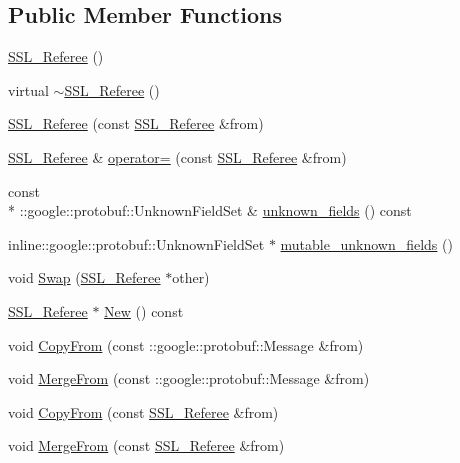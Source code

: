 \subsection*{Public Member Functions}
\begin{DoxyCompactItemize}
\item 
\hyperlink{class_s_s_l___referee_a093eac7249efad9cc2841868b0a1a130}{S\-S\-L\-\_\-\-Referee} ()
\item 
virtual \hyperlink{class_s_s_l___referee_aacd1e7f1df293ed0c0d8441cdb005b6f}{$\sim$\-S\-S\-L\-\_\-\-Referee} ()
\item 
\hyperlink{class_s_s_l___referee_ab26b371158dcb6d5ce7034c042829efc}{S\-S\-L\-\_\-\-Referee} (const \hyperlink{class_s_s_l___referee}{S\-S\-L\-\_\-\-Referee} \&from)
\item 
\hyperlink{class_s_s_l___referee}{S\-S\-L\-\_\-\-Referee} \& \hyperlink{class_s_s_l___referee_a41f6b8fc601ceb95f38dcfffb3e1102b}{operator=} (const \hyperlink{class_s_s_l___referee}{S\-S\-L\-\_\-\-Referee} \&from)
\item 
const \\*
\-::google\-::protobuf\-::\-Unknown\-Field\-Set \& \hyperlink{class_s_s_l___referee_a7b5d65bdf5c73d7d38f3581f33bd60df}{unknown\-\_\-fields} () const 
\item 
inline\-::google\-::protobuf\-::\-Unknown\-Field\-Set $\ast$ \hyperlink{class_s_s_l___referee_a4ee4e8c3f65057449661137b87cb4b8a}{mutable\-\_\-unknown\-\_\-fields} ()
\item 
void \hyperlink{class_s_s_l___referee_a8e6cdf85d949df10f65a3af1384ebcb9}{Swap} (\hyperlink{class_s_s_l___referee}{S\-S\-L\-\_\-\-Referee} $\ast$other)
\item 
\hyperlink{class_s_s_l___referee}{S\-S\-L\-\_\-\-Referee} $\ast$ \hyperlink{class_s_s_l___referee_abfaca893f74ef96eb4c4ad9c2d14edcc}{New} () const 
\item 
void \hyperlink{class_s_s_l___referee_ab67f7eb473dae8eac4097fcb9c9984cf}{Copy\-From} (const \-::google\-::protobuf\-::\-Message \&from)
\item 
void \hyperlink{class_s_s_l___referee_ab24e28063cdc860edcb2f603818eb283}{Merge\-From} (const \-::google\-::protobuf\-::\-Message \&from)
\item 
void \hyperlink{class_s_s_l___referee_a521fb86c2bec04a9e34b886ccd6e3ca8}{Copy\-From} (const \hyperlink{class_s_s_l___referee}{S\-S\-L\-\_\-\-Referee} \&from)
\item 
void \hyperlink{class_s_s_l___referee_abc47af17925e0daa2735167b158d9cea}{Merge\-From} (const \hyperlink{class_s_s_l___referee}{S\-S\-L\-\_\-\-Referee} \&from)

\end{DoxyCompactItemize}
